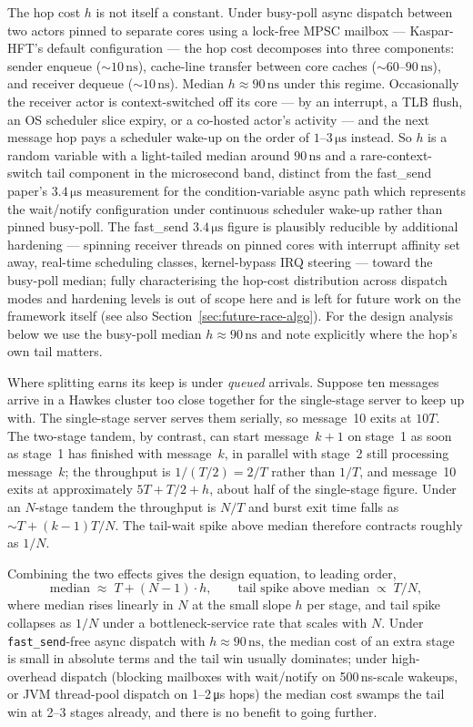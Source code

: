 \documentclass[11pt]{article}
\begin{document}
The hop cost $h$ is not itself a constant. Under busy-poll async dispatch between two actors pinned to separate cores using a lock-free MPSC mailbox --- Kaspar-HFT's default configuration --- the hop cost decomposes into three components: sender enqueue ($\sim 10\,\mathrm{ns}$), cache-line transfer between core caches ($\sim 60$--$90\,\mathrm{ns}$), and receiver dequeue ($\sim 10\,\mathrm{ns}$). Median $h \approx 90\,\mathrm{ns}$ under this regime. Occasionally the receiver actor is context-switched off its core --- by an interrupt, a TLB flush, an OS scheduler slice expiry, or a co-hosted actor's activity --- and the next message hop pays a scheduler wake-up on the order of $1$--$3\,\si{\micro\second}$ instead. So $h$ is a random variable with a light-tailed median around $90\,\mathrm{ns}$ and a rare-context-switch tail component in the microsecond band, distinct from the fast\_send paper's $3.4\,\si{\micro\second}$ measurement for the condition-variable async path \citep{mayeski_actorhft} which represents the wait/notify configuration under continuous scheduler wake-up rather than pinned busy-poll. The fast\_send $3.4\,\si{\micro\second}$ figure is plausibly reducible by additional hardening --- spinning receiver threads on pinned cores with interrupt affinity set away, real-time scheduling classes, kernel-bypass IRQ steering --- toward the busy-poll median; fully characterising the hop-cost distribution across dispatch modes and hardening levels is out of scope here and is left for future work on the framework itself (see also Section~\ref{sec:future-race-algo}). For the design analysis below we use the busy-poll median $h \approx 90\,\mathrm{ns}$ and note explicitly where the hop's own tail matters.

Where splitting earns its keep is under \emph{queued} arrivals. Suppose ten messages arrive in a Hawkes cluster too close together for the single-stage server to keep up with. The single-stage server serves them serially, so message~10 exits at $10T$. The two-stage tandem, by contrast, can start message~$k+1$ on stage~1 as soon as stage~1 has finished with message~$k$, in parallel with stage~2 still processing message~$k$; the throughput is $1/(T/2) = 2/T$ rather than $1/T$, and message~10 exits at approximately $5T + T/2 + h$, about half of the single-stage figure. Under an $N$-stage tandem the throughput is $N/T$ and burst exit time falls as $\sim T + (k-1)T/N$. The tail-wait spike above median therefore contracts roughly as $1/N$.

Combining the two effects gives the design equation, to leading order,
$$
\text{median} \;\approx\; T + (N - 1)\cdot h, \qquad \text{tail spike above median} \;\propto\; T/N,
$$
where median rises linearly in $N$ at the small slope $h$ per stage, and tail spike collapses as $1/N$ under a bottleneck-service rate that scales with $N$. Under \texttt{fast\_send}-free async dispatch with $h \approx 90\,\mathrm{ns}$, the median cost of an extra stage is small in absolute terms and the tail win usually dominates; under high-overhead dispatch (blocking mailboxes with wait/notify on 500\,\si{\nano\second}-scale wakeups, or JVM thread-pool dispatch on 1--2\,\si{\micro\second} hops) the median cost swamps the tail win at 2--3 stages already, and there is no benefit to going further.
\end{document}
